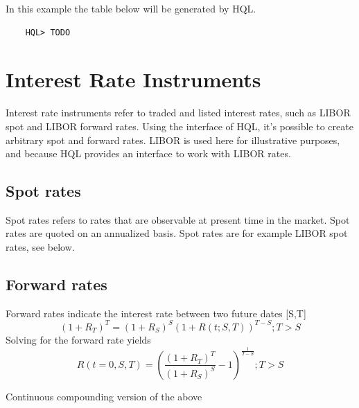\documentclass[11pt,a4paper]{article}
\numberwithin{equation}{section}
\begin{document}
	In this example the table below will be generated by HQL.

	\FrameSep
	\begin{lstlisting}
	HQL> TODO
	\end{lstlisting}
	\FrameSep


	\section{Interest Rate Instruments}
	Interest rate instruments refer to traded and listed interest rates, such as LIBOR spot and LIBOR forward rates.
	Using the interface of HQL, it's possible to create arbitrary spot and forward rates. LIBOR is used here for illustrative purposes,
	and because HQL provides an interface to work with LIBOR rates.
	

	\subsection{Spot rates}
	Spot rates refers to rates that are observable at present time in the market.
	Spot rates are quoted on an annualized basis. Spot rates are for example LIBOR spot rates, see below. 

	\subsection{Forward rates}
	Forward rates indicate the interest rate between two future dates [S,T]
	\[
	(1+R_T)^T=(1+R_S)^S(1+R(t;S,T))^{T-S}; T>S
	\]
	Solving for the forward rate yields
	\[
	R(t=0,S,T)=\left( \frac{(1+R_T)^T}{(1+R_S)^S} - 1 \right)^{\frac{1}{T-S}};T>S
	\]

	Continuous compounding version of the above
\end{document}
